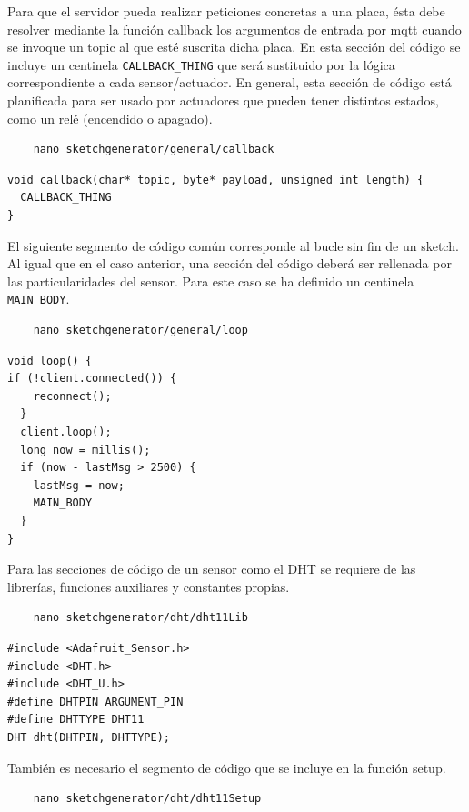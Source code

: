 Para que el servidor pueda realizar peticiones concretas a una placa, ésta debe resolver mediante la función callback los argumentos de entrada por \gls{mqtt} cuando se invoque un topic al que esté suscrita dicha placa. En esta sección del código se incluye un centinela \verb|CALLBACK_THING| que será sustituido por la lógica correspondiente a cada sensor/actuador. En general, esta sección de código está planificada para ser usado por actuadores que pueden tener distintos estados, como un relé (encendido o apagado).

\begin{verbatim}
    nano sketchgenerator/general/callback
\end{verbatim}

\begin{verbatim}
void callback(char* topic, byte* payload, unsigned int length) {
  CALLBACK_THING
}
\end{verbatim}


El siguiente segmento de código común corresponde al bucle sin fin de un \gls{sketch}. Al igual que en el caso anterior, una sección del código deberá ser rellenada por las particularidades del sensor. Para este caso se ha definido un centinela \verb|MAIN_BODY|.

\begin{verbatim}
    nano sketchgenerator/general/loop
\end{verbatim}

\begin{verbatim}
void loop() {
if (!client.connected()) {
    reconnect();
  }
  client.loop();
  long now = millis();
  if (now - lastMsg > 2500) {
    lastMsg = now;
    MAIN_BODY
  }
}
\end{verbatim}

Para las secciones de código de un sensor como el DHT se requiere de las librerías, funciones auxiliares y constantes propias.
\begin{verbatim}
    nano sketchgenerator/dht/dht11Lib
\end{verbatim}

\begin{verbatim}
#include <Adafruit_Sensor.h>
#include <DHT.h>
#include <DHT_U.h>
#define DHTPIN ARGUMENT_PIN
#define DHTTYPE DHT11
DHT dht(DHTPIN, DHTTYPE);
\end{verbatim}

También es necesario el segmento de código que se incluye en la función setup.
\begin{verbatim}
    nano sketchgenerator/dht/dht11Setup
\end{verbatim}


